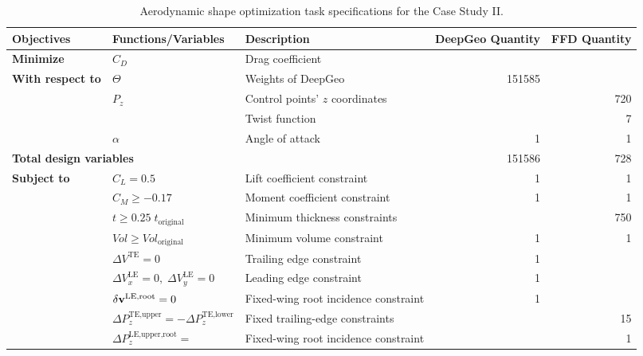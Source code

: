 \begin{table}[!ht]
  \centering
  \caption{\small Aerodynamic shape optimization task specifications for the Case Study II.}
  \resizebox{1\columnwidth}{!} {
        \begin{tabular}{lllrr}
        \hline
        \multicolumn{1}{l}{\textbf{Objectives}} & \textbf{Functions/Variables} & \textbf{Description} & \multicolumn{1}{l}{\textbf{DeepGeo Quantity}} & \multicolumn{1}{l}{\textbf{FFD Quantity}} \\
        \hline
        \multicolumn{1}{l}{\textbf{Minimize}} & $C_D$  & Drag coefficient &        &  \\
        \hline
        \multicolumn{1}{l}{\multirow{3}[2]{*}{\textbf{With respect to}}} & $\Theta$ & Weights of DeepGeo & \num{151585} &         \\
        \multicolumn{1}{l}{} & $P_z$  & Control points' $z$ coordinates &        & 720 \\
        \multicolumn{1}{l}{} &   & Twist function &        & 7 \\
        \multicolumn{1}{l}{} & $\alpha$ & Angle of attack & 1      & 1 \\
        \hline
        \multicolumn{3}{l}{\textbf{Total design variables}} & \num{151586} & 728 \\
        \hline
        \multicolumn{1}{l}{\multirow{9}[2]{*}{\textbf{Subject to}}} & $C_L=0.5$ & Lift coefficient constraint & 1      & 1 \\
        \multicolumn{1}{r}{} & $C_M\geq-0.17$ & Moment coefficient constraint & 1      & 1 \\
        \multicolumn{1}{r}{} & $t \ge 0.25 \; t_\text{original}$ & Minimum thickness constraints &        & 750 \\
        \multicolumn{1}{r}{} & $Vol \ge {Vol}_\text{original}$ & Minimum volume constraint & 1      & 1  \\
        \multicolumn{1}{r}{} & $\Delta V^\text{TE}=0$ & Trailing edge constraint & 1      &  \\
        \multicolumn{1}{r}{} & $\Delta V^\text{LE}_x=0,\;\Delta V^\text{LE}_y=0$ & Leading edge constraint & 1      &  \\
        \multicolumn{1}{r}{} & $\delta\mathbf{v}^{\text{LE,root}}=0$ & Fixed-wing root incidence constraint & 1      &  \\
        \multicolumn{1}{r}{} & $\Delta P^{\text{TE,upper}}_z = -\Delta P^{\text{TE,lower}}_z$ & Fixed trailing-edge constraints &        & 15 \\
        \multicolumn{1}{l}{} & $\Delta P^{\text{LE,upper,root}}_z =$ & \multirow{2}[1]{*}{Fixed-wing root incidence constraint} & \multirow{2}[1]{*}{} & \multirow{2}[1]{*}{1} \\

\end{tabular}}
\end{table}
